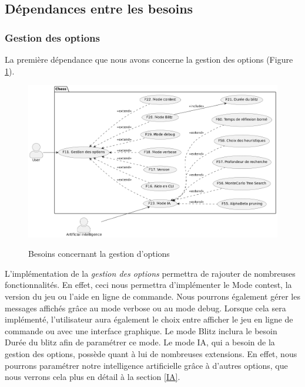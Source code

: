 \documentclass{article}
\begin{document}
\subsection{Dépendances entre les besoins}
\subsubsection{Gestion des options}
La première dépendance que nous avons concerne la gestion des options (Figure \ref{fig:needs_options}).

\begin{figure}[h]
    \caption{Besoins concernant la gestion d'options}
    \centering
    \includegraphics[width=\textwidth,height=\textheight,keepaspectratio]{needs_options}
    \label{fig:needs_options}
\end{figure} 

L'implémentation de la \textit{gestion des options }permettra de rajouter de nombreuses fonctionnalités.
En effet, ceci nous permettra d'implémenter le Mode contest, la version du jeu ou l'aide en ligne de commande. Nous pourrons également gérer les messages affichés grâce au mode verbose ou au mode debug.
Lorsque cela sera implémenté, l'utilisateur aura également le choix entre afficher le jeu en ligne de commande ou avec une interface graphique.
Le mode Blitz inclura le besoin Durée du blitz afin de paramétrer ce mode.
Le mode IA, qui a besoin de la gestion des options, possède quant à lui de nombreuses extensions. En effet, nous pourrons paramétrer
notre intelligence artificielle grâce à d'autres options, que nous verrons cela plus en détail à la section \ref{IA}.
\end{document}
